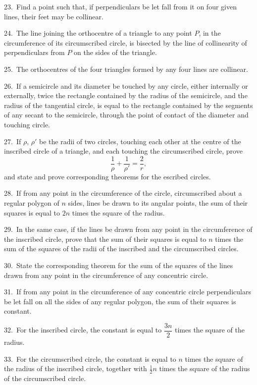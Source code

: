 \documentclass[oneside]{book}
\begin{document}
\begin{footnotesize}
23.~Find a point such that, if perpendiculars be let fall from it
on four given lines, their feet may be collinear.

24.~The line joining the orthocentre of a triangle to any point
$P$, in the circumference of its circumscribed circle, is bisected by
the line of collinearity of perpendiculars from $P$ on the sides of
the triangle.

25.~The orthocentres of the four triangles formed by any four
lines are collinear.

26.~If a semicircle and its diameter be touched by any circle,
either internally or externally, twice the rectangle contained by
the radius of the semicircle, and the radius of the tangential circle,
is equal to the rectangle contained by the segments of any secant
to the semicircle, through the point of contact of the diameter and
touching circle.

27.~If $\rho$, $\rho'$ be the radii of two circles, touching each other at
the centre of the inscribed circle of a triangle, and each touching
the circumscribed circle, prove
\[
\frac{ 1 }{\rho} + \frac{1 }{\rho'}  = \frac{2 }{r} ,
\]
and state and prove corresponding theorems for the escribed
circles.

28.~If from any point in the circumference of the circle, circumscribed
about a regular polygon of $n$ sides, lines be drawn to
its angular points, the sum of their squares is equal to $2n$ times
the square of the radius.

29.~In the same case, if the lines be drawn from any point in
the circumference of the inscribed circle, prove that the sum of
their squares is equal to $n$ times the sum of the squares of the
radii of the inscribed and the circumscribed circles.

30.~State the corresponding theorem for the sum of the squares
of the lines drawn from any point in the circumference of any
concentric circle.


31.~If from any point in the circumference of any concentric
circle perpendiculars be let fall on all the sides of any regular
polygon, the sum of their squares is constant.

32.~For the inscribed circle, the constant is equal to $\dfrac{3n}{ 2}$ times
the square of the radius.

33.~For the circumscribed circle, the constant is equal to $n$
times the square of the radius of the inscribed circle, together with
$\frac{ 1}{ 2} n$ times the square of the radius of the circumscribed circle.


\end{footnotesize}
\end{document}
